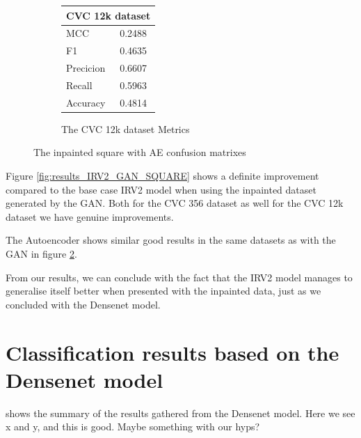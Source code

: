 \begin{figure}[h]
\begin{subfigure}[b]{0.25\textwidth}
        \begin{tabular}{ll}
        \toprule
        \multicolumn{2}{c}{CVC 12k dataset}        \\
        \midrule
        MCC 		& 0.2488 \\
        F1  		& 0.4635 \\
        Precicion  	& 0.6607 \\
        Recall     	& 0.5963 \\
        Accuracy	& 0.4814 \\
        \bottomrule
        \end{tabular}
\caption{The CVC 12k dataset Metrics}
\label{tab:cvc12k_metrics_IRV2_AE_SQUARE}
\end{subfigure}
\caption{The inpainted square with AE confusion matrixes}
\label{fig:results_IRV2_AE_SQUARE}
\end{figure}
\FloatBarrier


Figure \ref{fig:results_IRV2_GAN_SQUARE} shows a definite improvement compared to the base case IRV2 model when using the inpainted dataset generated by the GAN. Both for the CVC 356 dataset as well for the CVC 12k dataset we have genuine improvements.

The Autoencoder shows similar good results in the same datasets as with the GAN in figure \ref{fig:results_IRV2_AE_SQUARE}. 

From our results, we can conclude with the fact that the IRV2 model manages to generalise itself better when presented with the inpainted data, just as we concluded with the Densenet model.



\section{Classification results based on the Densenet model}
 shows the summary of the results gathered from the Densenet model.
Here we see x and y, and this is good. 
Maybe something with our hyps?



